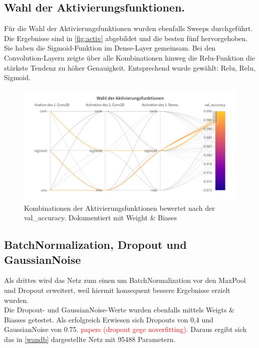 \documentclass[
fontsize=12pt,					%
paper=a4,						%
twoside=true, 					%
listof=totoc, 					%
bibliography=totoc,				%
titlepage, 						%
headsepline, 					%
DIV=12,							%
BCOR=6mm,						%
cleardoublepage=empty,			%
parskip,							%
ngerman
]{scrartcl}
\begin{document}
\subsection{Wahl der Aktivierungsfunktionen.}

Für die Wahl der Aktivierungsfunktionen wurden ebenfalls Sweeps durchgeführt. Die Ergebnisse sind in \autoref{fig:activ} abgebildet und die besten fünf hervorgehoben. Sie haben die Sigmoid-Funktion im Dense-Layer gemeinsam. Bei den Convolution-Layern zeigte über alle Kombinationen hinweg die Relu-Funktion die stärkste Tendenz zu höher Genauigkeit. Entsprechend wurde gewählt: Relu, Relu, Sigmoid.

\begin{figure}[h]
	\centering
	\includegraphics[width=0.7\linewidth]{images/Activ}
	\caption{Kombinationen der Aktivierungsfunktionen bewertet nach der val\_accuracy. Dokumentiert mit Weight \& Biases}
	\label{fig:activ}
\end{figure}

\subsection{BatchNormalization, Dropout und GaussianNoise}

Als drittes wird das Netz zum einen um BatchNormalization vor den MaxPool und Dropout erweitert, weil hiermit konsequent bessere Ergebnisse erzielt wurden.\\
Die Dropout- und GaussianNoise-Werte wurden ebenfalls mittels Weigts \& Biasses getestet. Als erfolgreich Erwiesen sich Dropouts von 0,4 und GaussianNoise von 0.75. \textcolor{red}{papers (dropout gege noverfitting)}. Daraus ergibt sich das in \autoref{wandb} dargestellte Netz mit 95488 Parametern.
\end{document}
